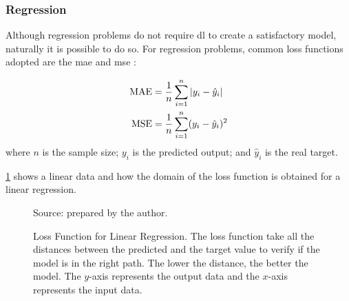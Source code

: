 \subsubsection*{Regression}

Although regression problems do not require \gls*{dl} to create a satisfactory model, naturally it is possible to do so.
For regression problems, common loss functions adopted are the \gls*{mae} and \gls*{mse} \citep{bussab2017}:

\begin{align}
    \text{MAE} &= \frac{1}{n} \sum_{i=1}^n |y_i - \hat{y}_i| 
    \label{eq:mae} \\
    \text{MSE} &= \frac{1}{n} \sum_{i=1}^n (y_i - \hat{y}_i)^2
    \label{eq:mse}
\end{align}
%
where \(n\) is the sample size; \(y_i\) is the predicted output; and \(\hat{y}_i\) is the real target.

\cref{fig:mae_chart} shows a linear data and how the domain of the loss function is obtained for a linear regression.
%
\begin{figure}[!htb]
    \centering
    \caption[Loss Function for Linear Regression]{Loss Function for Linear Regression. The loss function take all the distances between the predicted and the target value to verify if the model is in the right path. The lower the distance, the better the model. The \(y\)-axis represents the output data and the \(x\)-axis represents the input data.}
    
    
    {\footnotesize Source: prepared by the author.}
    \label{fig:mae_chart}
\end{figure}



